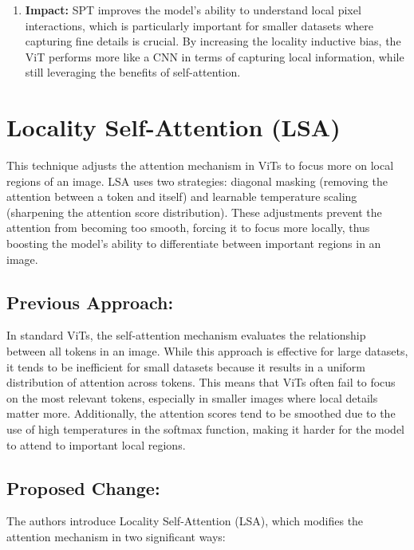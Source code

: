 \documentclass{report}
\begin{document}
	\begin{enumerate}
		\item 
		\textbf{Impact:} SPT improves the model’s ability to understand local pixel interactions, which is particularly important for smaller datasets where capturing fine details is crucial. By increasing the locality inductive bias, the ViT performs more like a CNN in terms of capturing local information, while still leveraging the benefits of self-attention.
	\end{enumerate}
	
	
	
	
	
	\section{Locality Self-Attention (LSA)}
	This technique adjusts the attention mechanism in ViTs to focus more on local regions of an image. LSA uses two strategies: diagonal masking (removing the attention between a token and itself) and learnable temperature scaling (sharpening the attention score distribution). These adjustments prevent the attention from becoming too smooth, forcing it to focus more locally, thus boosting the model’s ability to differentiate between important regions in an image.
	
	\subsection{Previous Approach:}
	In standard ViTs, the self-attention mechanism evaluates the relationship between all tokens in an image. While this approach is effective for large datasets, it tends to be inefficient for small datasets because it results in a uniform distribution of attention across tokens. This means that ViTs often fail to focus on the most relevant tokens, especially in smaller images where local details matter more. Additionally, the attention scores tend to be smoothed due to the use of high temperatures in the softmax function, making it harder for the model to attend to important local regions.
	
	\subsection{Proposed Change:}
	The authors introduce Locality Self-Attention (LSA), which modifies the attention mechanism in two significant ways:
	
\end{document}
